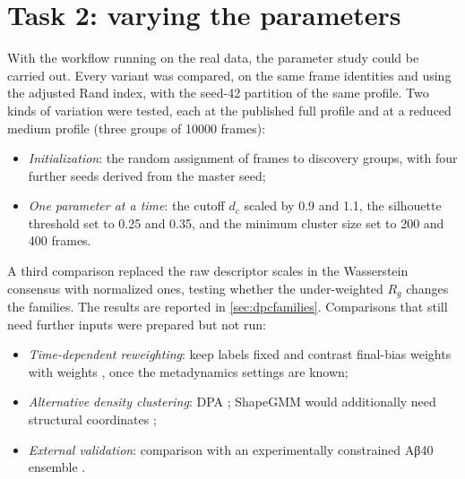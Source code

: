 \section{Task 2: varying the parameters}
\label{sec:task2}
With the workflow running on the real data, the parameter study could be carried out. Every variant was compared, on the same frame identities and using the adjusted Rand index, with the seed-42 partition of the same profile. Two kinds of variation were tested, each at the published full profile and at a reduced medium profile (three groups of \num{10000} frames):
\begingroup\makeatletter{}\makeatother
\begin{itemize}
\item \emph{Initialization}: the random assignment of frames to discovery groups, with four further seeds derived from the master seed;
\item \emph{One parameter at a time}: the cutoff $d_c$ scaled by 0.9 and 1.1, the silhouette threshold set to 0.25 and 0.35, and the minimum cluster size set to 200 and 400 frames.
\end{itemize}
\endgroup
A third comparison replaced the raw descriptor scales in the Wasserstein consensus with normalized ones, testing whether the under-weighted $R_g$ changes the families. The results are reported in \cref{sec:dpcfamilies}. Comparisons that still need further inputs were prepared but not run:
\begin{itemize}
\item \emph{Time-dependent reweighting}: keep labels fixed and contrast final-bias weights with  weights \autocite{tiwary2015,bonomi2009,plumedreweight}, once the metadynamics settings are known;
\item \emph{Alternative density clustering}: DPA \autocite{derrico2021}; ShapeGMM would additionally need structural coordinates \autocite{sasmal2024};
\item \emph{External validation}: comparison with an experimentally constrained Aβ40 ensemble \autocite{borthakur2025}.
\end{itemize}

